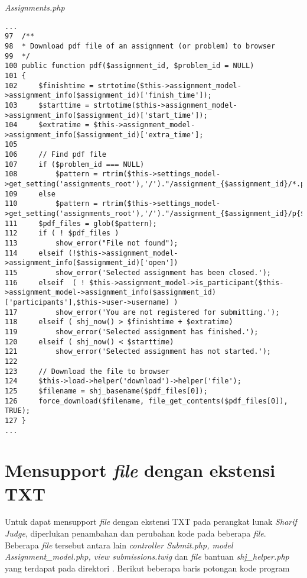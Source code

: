 \textit{Assignments.php}
\begin{lstlisting}[basicstyle=\ttfamily, frame=single,
columns=fullflexible, keepspaces=true, breaklines=true]
...
97	/**
98	* Download pdf file of an assignment (or problem) to browser
99	*/
100	public function pdf($assignment_id, $problem_id = NULL)
101	{
102		$finishtime = strtotime($this->assignment_model->assignment_info($assignment_id)['finish_time']);
103		$starttime = strtotime($this->assignment_model->assignment_info($assignment_id)['start_time']);
104		$extratime = $this->assignment_model->assignment_info($assignment_id)['extra_time'];
105
106		// Find pdf file
107		if ($problem_id === NULL)
108			$pattern = rtrim($this->settings_model->get_setting('assignments_root'),'/')."/assignment_{$assignment_id}/*.pdf";
109		else
110			$pattern = rtrim($this->settings_model->get_setting('assignments_root'),'/')."/assignment_{$assignment_id}/p{$problem_id}/*.pdf";
111		$pdf_files = glob($pattern);
112		if ( ! $pdf_files )
113			show_error("File not found");
114		elseif (!$this->assignment_model->assignment_info($assignment_id)['open'])
115			show_error('Selected assignment has been closed.');
116		elseif	( ! $this->assignment_model->is_participant($this->assignment_model->assignment_info($assignment_id)['participants'],$this->user->username) )
117			show_error('You are not registered for submitting.');
118		elseif ( shj_now() > $finishtime + $extratime)
119			show_error('Selected assignment has finished.');
120		elseif ( shj_now() < $starttime)
121			show_error('Selected assignment has not started.');
122			
123		// Download the file to browser
124		$this->load->helper('download')->helper('file');
125		$filename = shj_basename($pdf_files[0]);
126		force_download($filename, file_get_contents($pdf_files[0]), TRUE);
127	}
...
\end{lstlisting}

\section{Mensupport \textit{file} dengan ekstensi TXT}
Untuk dapat mensupport \textit{file} dengan ekstensi TXT pada perangkat lunak \textit{Sharif Judge}, diperlukan penambahan dan perubahan kode pada beberapa \textit{file}. Beberapa \textit{file} tersebut antara lain \textit{controller Submit.php, model Assignment\_model.php, view submissions.twig} dan \textit{file} bantuan \textit{shj\_helper.php} yang terdapat pada direktori . Berikut beberapa baris potongan kode program

